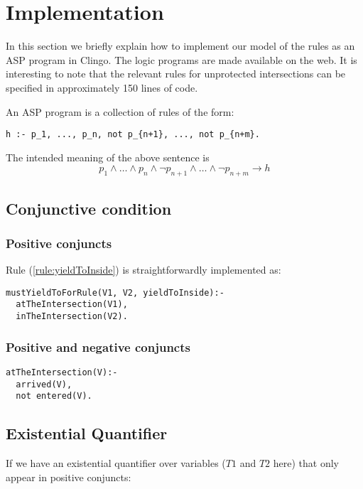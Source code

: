 \section{Implementation}
\label{sec:implementation}

In this section we briefly explain how to implement
our model of the rules as an ASP program in Clingo.
The logic programs are made available on the web.%
It is interesting to note that the relevant rules for unprotected intersections can be specified in approximately 150 lines of code.

An ASP program is a collection of rules of the form:
\begin{verbatim}
h :- p_1, ..., p_n, not p_{n+1}, ..., not p_{n+m}.
\end{verbatim}
The intended meaning of the above sentence is
$$ p_1 \land \dots \land p_n \land  \neg p_{n+1} \land \dots \land \neg p_{n+m} \rightarrow h $$

\subsection{Conjunctive condition}
\subsubsection{Positive conjuncts}
Rule (\ref{rule:yieldToInside}) is straightforwardly implemented as:
\begin{verbatim}
mustYieldToForRule(V1, V2, yieldToInside):-
  atTheIntersection(V1),
  inTheIntersection(V2).
\end{verbatim}

\subsubsection{Positive and negative conjuncts}
\begin{verbatim}
atTheIntersection(V):-
  arrived(V),
  not entered(V).
\end{verbatim}

\subsection{Existential Quantifier}
If we have an existential quantifier
over variables ($T1$ and $T2$ here)
that only appear in positive conjuncts:

